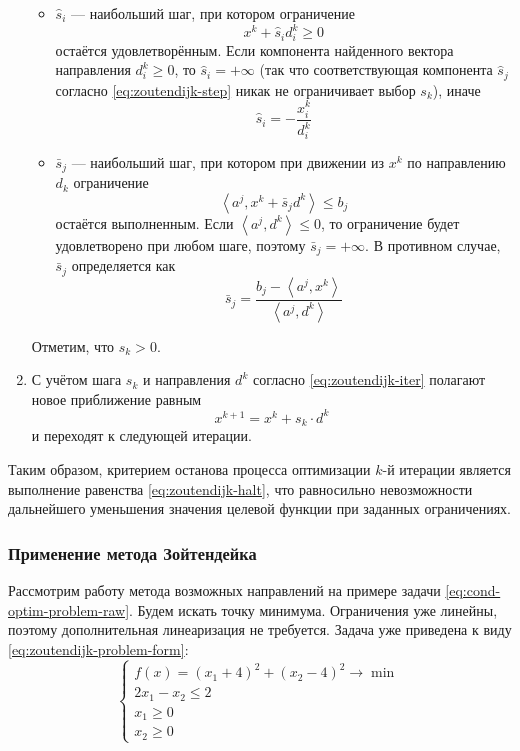 \documentclass{article}
\renewcommand{\leq}{\leqslant}
\renewcommand{\geq}{\geqslant}
\newcommand{\mul}{\cdot}
\newcommand{\scalmult}[1]{{\left \langle #1 \right \rangle}}
\theoremstyle{remark}
\theoremstyle{definition}
\numberwithin{equation}{section}
\begin{document}
\begin{enumerate}
\begin{itemize}
  \item $\hat{s}_i$ — наибольший шаг, при котором ограничение
    \begin{equation*}
      x^k+\hat{s}_i d^k_i \geq 0
    \end{equation*}
    остаётся удовлетворённым. Если компонента найденного вектора
    направления $d^k_i \geq 0$, то $\hat{s}_i = +\infty$ (так что
    соответствующая компонента $\hat{s}_j$ согласно
    \eqref{eq:zoutendijk-step} никак не ограничивает выбор $s_k$),
    иначе
    \begin{equation*}
      \hat{s}_i = -\frac{x^k_i}{d^k_i}
    \end{equation*}

  \item $\bar{s}_j$ — наибольший шаг, при котором при движении из
    $x^k$ по направлению $d_k$ ограничение
    \begin{equation*}
      \scalmult{a^j, x^k+\bar{s}_j d^k} \leq b_j
    \end{equation*}
    остаётся выполненным. Если $\scalmult{a^j, d^k} \leq 0$, то
    ограничение будет удовлетворено при любом шаге, поэтому $\bar{s}_j
    = +\infty$. В противном случае, $\bar{s}_j$ определяется как
    \begin{equation*}
      \bar{s}_j = \frac{b_j-\scalmult{a^j, x^k}}{\scalmult{a^j, d^k}}
    \end{equation*}
  \end{itemize}
  Отметим, что $s_k>0$.
\item С учётом шага $s_k$ и направления $d^k$ согласно
  \eqref{eq:zoutendijk-iter} полагают новое приближение равным
  \begin{equation*}
    x^{k+1} = x^k + s_k \mul d^k
  \end{equation*}
  и переходят к следующей итерации.
\end{enumerate}

Таким образом, критерием останова процесса оптимизации $k$-й итерации
является выполнение равенства \eqref{eq:zoutendijk-halt}, что
равносильно невозможности дальнейшего уменьшения значения целевой
функции при заданных ограничениях.

\subsubsection{Применение метода Зойтендейка}

Рассмотрим работу метода возможных направлений на примере задачи
\eqref{eq:cond-optim-problem-raw}. Будем искать точку минимума.
Ограничения уже линейны, поэтому дополнительная линеаризация не
требуется. Задача уже приведена к виду
\eqref{eq:zoutendijk-problem-form}:
\begin{equation}
  \label{eq:zoutendijk-problem}
  \begin{cases}
    f(x) = (x_1+4)^2 + (x_2-4)^2 \to \min \\
    2x_1-x_2 \leq 2 \\
    x_1 \geq 0 \\
    x_2 \geq 0
  \end{cases}
\end{equation}
\end{document}
